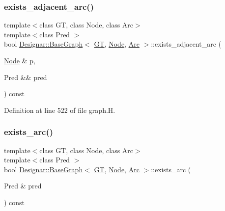 \subsubsection{\texorpdfstring{exists\+\_\+adjacent\+\_\+arc()}{exists\_adjacent\_arc()}\hspace{0.1cm}{\footnotesize\ttfamily [2/2]}}
{\footnotesize\ttfamily template$<$class GT, class Node, class Arc$>$ \\
template$<$class Pred $>$ \\
bool \hyperlink{class_designar_1_1_base_graph}{Designar\+::\+Base\+Graph}$<$ \hyperlink{demo-buildgraph_8_c_a3001c40d2c31ca87ed96cd7d1334a55e}{GT}, \hyperlink{namespace_designar_a5af326c65aa2bd26b26c410f2030d09e}{Node}, \hyperlink{namespace_designar_a3f55fb5513d62ff47cbc8f72b8e95d6f}{Arc} $>$\+::exists\+\_\+adjacent\+\_\+arc (\begin{DoxyParamCaption}\item[{\hyperlink{namespace_designar_a5af326c65aa2bd26b26c410f2030d09e}{Node} \&}]{p,  }\item[{Pred \&\&}]{pred }\end{DoxyParamCaption}) const\hspace{0.3cm}{\ttfamily [inline]}}



Definition at line 522 of file graph.\+H.

\mbox{\label{class_designar_1_1_base_graph_aaed186c42ed6b51f761cda959ecde601}} 
\subsubsection{\texorpdfstring{exists\+\_\+arc()}{exists\_arc()}\hspace{0.1cm}{\footnotesize\ttfamily [1/2]}}
{\footnotesize\ttfamily template$<$class GT, class Node, class Arc$>$ \\
template$<$class Pred $>$ \\
bool \hyperlink{class_designar_1_1_base_graph}{Designar\+::\+Base\+Graph}$<$ \hyperlink{demo-buildgraph_8_c_a3001c40d2c31ca87ed96cd7d1334a55e}{GT}, \hyperlink{namespace_designar_a5af326c65aa2bd26b26c410f2030d09e}{Node}, \hyperlink{namespace_designar_a3f55fb5513d62ff47cbc8f72b8e95d6f}{Arc} $>$\+::exists\+\_\+arc (\begin{DoxyParamCaption}\item[{Pred \&}]{pred }\end{DoxyParamCaption}) const\hspace{0.3cm}{\ttfamily [inline]}}



